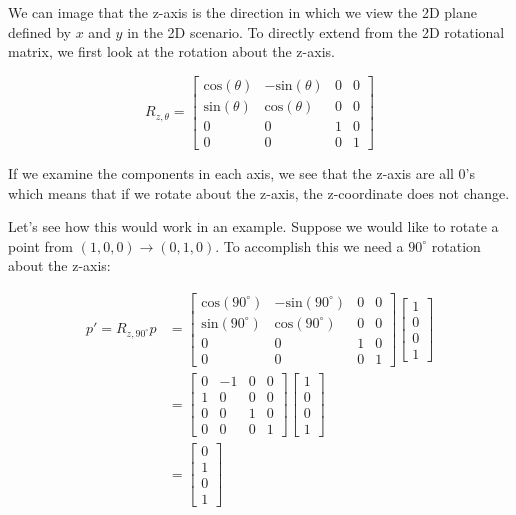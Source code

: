 \documentclass[12pt,letterpaper]{article}
\begin{document}
We can image that the z-axis is the direction in which we view the 2D plane defined by $x$ and $y$ in the 2D scenario. To directly extend from the 2D rotational matrix, we first look at the rotation about the z-axis.

\begin{equation}
    R_{z, \theta} = \begin{bmatrix}
        \text{cos}(\theta) & -\text{sin}(\theta) & 0 & 0 \\
        \text{sin}(\theta) &  \text{cos}(\theta) & 0 & 0 \\
        0 & 0 & 1 & 0 \\
        0 & 0 & 0 & 1
    \end{bmatrix}
\end{equation}

If we examine the components in each axis, we see that the z-axis are all 0's which means that if we rotate about the z-axis, the z-coordinate does not change.

\newpage

Let's see how this would work in an example. Suppose we would like to rotate a point from $(1, 0, 0) \rightarrow (0, 1, 0)$. To accomplish this we need a $90^{\circ}$ rotation about the z-axis:

\begin{equation}
    \begin{aligned}
    p' = R_{z, 90^{\circ}}p
    &= \begin{bmatrix}
        \text{cos}(90^{\circ}) & -\text{sin}(90^{\circ}) & 0 & 0 \\
        \text{sin}(90^{\circ}) &  \text{cos}(90^{\circ}) & 0 & 0 \\
        0 & 0 & 1 & 0 \\
        0 & 0 & 0 & 1
    \end{bmatrix}
     \begin{bmatrix}
        1 \\
        0 \\
        0 \\
        1
    \end{bmatrix} \\
    &= \begin{bmatrix}
        0 & -1 & 0 & 0 \\
        1 & 0  & 0 & 0 \\
        0 & 0  & 1 & 0 \\
        0 & 0  & 0 & 1
    \end{bmatrix}
     \begin{bmatrix}
        1 \\
        0 \\
        0 \\
        1
    \end{bmatrix} \\
    &= \begin{bmatrix}
        0 \\
        1 \\
        0 \\
        1
    \end{bmatrix}
    \end{aligned}
\end{equation}
\end{document}
